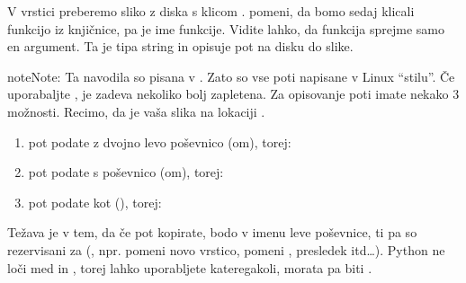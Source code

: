 \documentclass[letterpaper,10pt,english]{sphinxmanual}
\begin{document}
\begin{sphinxVerbatim}[commandchars=\\\{\}]
  
\end{sphinxVerbatim}

\sphinxAtStartPar
V vrstici  preberemo sliko z diska s klicom .  pomeni, da bomo sedaj klicali funkcijo iz knjičnice,  pa je ime funkcije. Vidite lahko, da funkcija sprejme samo en argument. Ta je tipa string in opisuje pot na disku do slike.

\begin{sphinxadmonition}{note}{Note:}
\sphinxAtStartPar
Ta navodila so pisana v  . Zato so vse poti napisane v Linux “stilu”. Če uporabaljte  , je zadeva nekoliko bolj zapletena. Za opisovanje poti imate nekako 3 možnosti. Recimo, da je vaša slika na lokaciji .
\begin{enumerate}
%
\item {} 
\sphinxAtStartPar
pot podate z dvojno levo poševnico (\sphinxhyphen{}om), torej: 

\item {} 
\sphinxAtStartPar
pot podate s poševnico (\sphinxhyphen{}om), torej: 

\item {} 
\sphinxAtStartPar
pot podate kot  (), torej: 

\end{enumerate}

\sphinxAtStartPar
Težava je v tem, da če pot kopirate, bodo v imenu leve poševnice, ti pa so rezervisani za  (, npr.  pomeni novo vrstico,  pomeni ,  presledek itd…).
Python ne loči med  in \sphinxcode{\sphinxupquote{\textquotesingle{}}}, torej lahko uporabljete kateregakoli, morata pa biti .
\end{sphinxadmonition}
\end{document}
